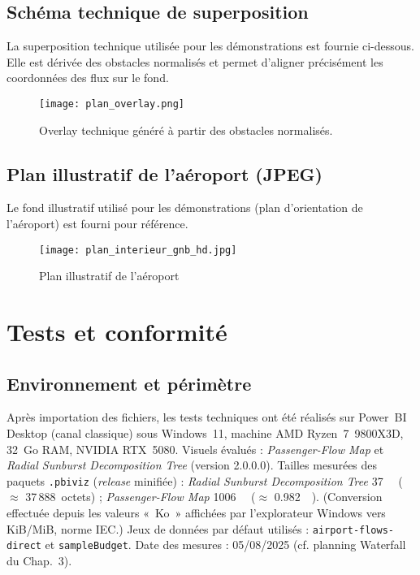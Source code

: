 \subsection{Schéma technique de superposition}
La superposition technique utilisée pour les démonstrations est fournie ci-dessous. 
Elle est dérivée des obstacles normalisés et permet d'aligner précisément les coordonnées des flux sur le fond.

\begin{figure}[h]
  \centering
  \texttt{[image: plan\_overlay.png]}
  \caption{Overlay technique généré à partir des obstacles normalisés.}
  \label{fig:a2-overlay}
\end{figure}

\subsection{Plan illustratif de l'aéroport (JPEG)}
Le fond illustratif utilisé pour les démonstrations (plan d’orientation de l’aéroport) est fourni pour référence.

\begin{figure}[h]
  \centering
  \texttt{[image: plan\_interieur\_gnb\_hd.jpg]}
  \caption{Plan illustratif de l'aéroport}
  \label{fig:a2-plan-jpeg}
\end{figure}

\section{Tests et conformité}
\label{ann:a3-tests}

\subsection{Environnement et périmètre}
Après importation des fichiers, les tests techniques ont été réalisés sur Power~BI Desktop 
(canal classique) sous Windows~11, machine AMD Ryzen~7~9800X3D, 32~Go RAM, NVIDIA RTX~5080. 
Visuels évalués : \textit{Passenger-Flow Map} et \textit{Radial Sunburst Decomposition Tree} (version 2.0.0.0). 
Tailles mesurées des paquets \texttt{.pbiviz} (\textit{release} minifiée) : 
\textit{Radial Sunburst Decomposition Tree} \SI{37}{\kibi\byte} (\(\approx\) 37\,888~octets) ; 
\textit{Passenger-Flow Map} \SI{1006}{\kibi\byte} (\(\approx\) \SI{0.982}{\mebi\byte}). 
(Conversion effectuée depuis les valeurs «~Ko~» affichées par l’explorateur Windows vers KiB/MiB, norme IEC.) 
Jeux de données par défaut utilisés : \texttt{airport-flows-direct} et \texttt{sampleBudget}. 
Date des mesures : 05/08/2025 (cf. planning Waterfall du Chap.~3).

